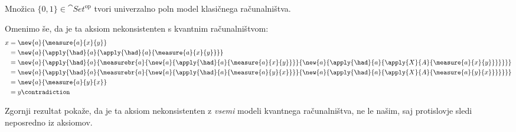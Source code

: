 \begin{proposition}
    Množica \(\{0,1\} ∈ \cat{Set}^{\textrm{op}}\) tvori univerzalno poln model klasičnega računalništva.
\end{proposition}

Omenimo še, da je ta aksiom nekonsistenten s kvantnim računalništvom:
\begin{align*}
    x &= \new{a}{\measure{a}{x}{y}}\\
      &= \new{a}{\apply{\had}{a}{\apply{\had}{a}{\measure{a}{x}{y}}}}\\
      &= \new{a}{\apply{\had}{a}{\measurebr{a}{
            \new{a}{\apply{\had}{a}{             \measure{a}{x}{y}}}}{
            \new{a}{\apply{\had}{a}{\apply{X}{A}{\measure{a}{x}{y}}}}
        }}}\\
      &= \new{a}{\apply{\had}{a}{\measurebr{a}{
            \new{a}{\apply{\had}{a}{             \measure{a}{y}{x}}}}{
            \new{a}{\apply{\had}{a}{\apply{X}{A}{\measure{a}{y}{x}}}}
        }}}\\
      &= \new{a}{\measure{a}{y}{x}}\\
      &= y \contradiction
\end{align*}
\begin{remark}
    Zgornji rezultat pokaže, da je ta aksiom nekonsistenten z \emph{vsemi} modeli kvantnega računalništva, ne le našim, saj protislovje sledi neposredno iz aksiomov.
\end{remark}
